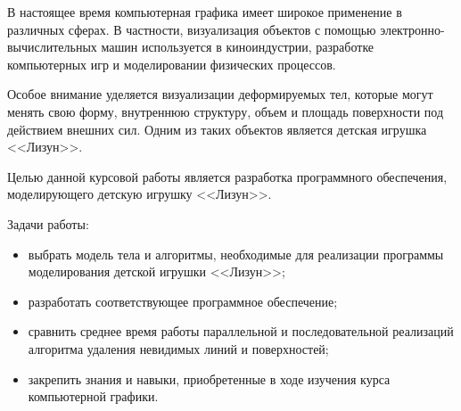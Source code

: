 
В настоящее время компьютерная графика имеет широкое применение в
различных сферах. В частности, визуализация объектов с помощью электронно-вычислительных машин используется в киноиндустрии, разработке компьютерных
игр и моделировании физических процессов.

Особое внимание уделяется визуализации деформируемых тел, которые
могут менять свою форму, внутреннюю структуру, объем и площадь поверхности
под действием внешних сил. Одним из таких объектов является детская игрушка
<<Лизун>>.

Целью данной курсовой работы является разработка программного обеспечения, моделирующего детскую игрушку <<Лизун>>.

Задачи работы:
\begin{itemize}
	\item выбрать модель тела и алгоритмы, необходимые для реализации программы моделирования детской игрушки <<Лизун>>;
	\item разработать соответствующее программное обеспечение;
	\item сравнить среднее время работы параллельной и последовательной реализаций алгоритма удаления невидимых линий и поверхностей;
	\item закрепить знания и навыки, приобретенные в ходе изучения курса компьютерной графики.
\end{itemize}

\clearpage
